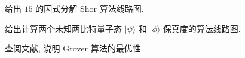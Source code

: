 \documentclass{assignment}
\begin{document}
\begin{prob}
    给出 $15$ 的因式分解 Shor 算法线路图.
\end{prob}
\begin{sol}
    
\end{sol}

\begin{prob}
    给出计算两个未知两比特量子态 $\lvert\psi\rangle$ 和 $\lvert\phi\rangle$ 保真度的算法线路图.
\end{prob}
\begin{sol}
    
\end{sol}

\begin{prob}
    查阅文献, 说明 Grover 算法的最优性.
\end{prob}
\begin{sol}
    
\end{sol}
\end{document}
